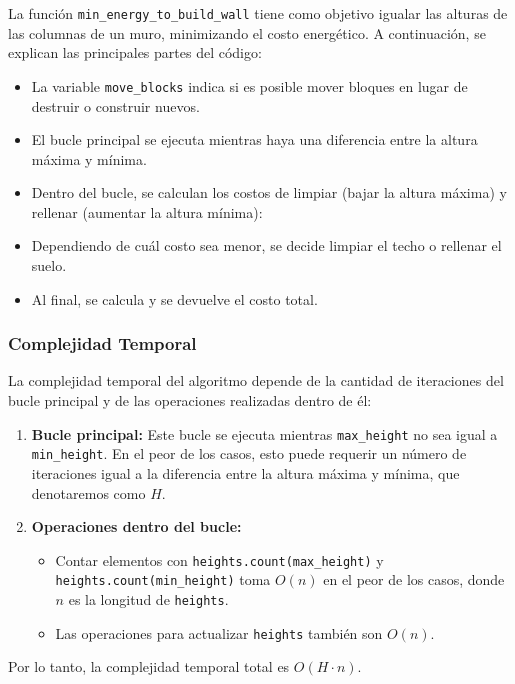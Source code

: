 \documentclass[a4paper,12pt]{article}
\begin{document}
La función \texttt{min\_energy\_to\_build\_wall} tiene como objetivo igualar las alturas de las columnas de un muro, minimizando el costo energético. A continuación, se explican las principales partes del código:

\begin{itemize}
	\item La variable \texttt{move\_blocks} indica si es posible mover bloques en lugar de destruir o construir nuevos.
	\item El bucle principal se ejecuta mientras haya una diferencia entre la altura máxima y mínima.
	\item Dentro del bucle, se calculan los costos de limpiar (bajar la altura máxima) y rellenar (aumentar la altura mínima):
	\item Dependiendo de cuál costo sea menor, se decide limpiar el techo o rellenar el suelo.
	\item Al final, se calcula y se devuelve el costo total.
\end{itemize}

\subsubsection{Complejidad Temporal}

La complejidad temporal del algoritmo depende de la cantidad de iteraciones del bucle principal y de las operaciones realizadas dentro de él:

\begin{enumerate}
	\item \textbf{Bucle principal:} Este bucle se ejecuta mientras \texttt{max\_height} no sea igual a \texttt{min\_height}. En el peor de los casos, esto puede requerir un número de iteraciones igual a la diferencia entre la altura máxima y mínima, que denotaremos como \( H \).
	\item \textbf{Operaciones dentro del bucle:}
	\begin{itemize}
		\item Contar elementos con \texttt{heights.count(max\_height)} y \texttt{heights.count(min\_height)} toma \( O(n) \) en el peor de los casos, donde \( n \) es la longitud de \texttt{heights}.
		\item Las operaciones para actualizar \texttt{heights} también son \( O(n) \).
	\end{itemize}
\end{enumerate}

Por lo tanto, la complejidad temporal total es \( O(H \cdot n) \).
\end{document}
